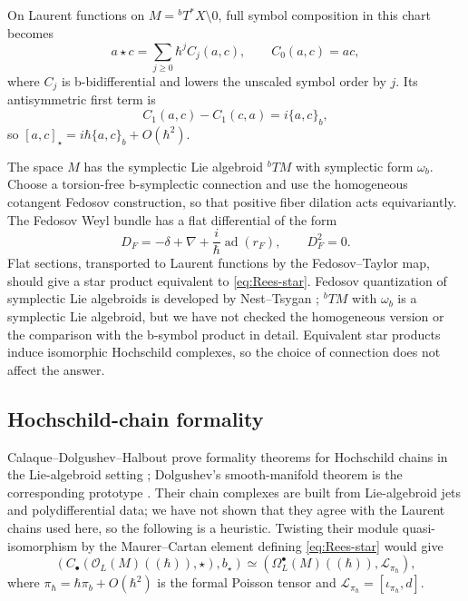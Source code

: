 \documentclass[11pt,oneside,reqno]{article}
\newcommand{\Tbstar}{{}^{b}T^*X}
\theoremstyle{plain}
\theoremstyle{definition}
\theoremstyle{remark}
\begin{document}
On Laurent functions on \(M=\Tbstar\setminus0\), full symbol composition in
this chart becomes
\begin{equation}\label{eq:Rees-star}
 a\star c=\sum_{j\geq0}\hbar^j C_j(a,c),
 \qquad C_0(a,c)=ac,
\end{equation}
where \(C_j\) is b-bidifferential and lowers the unscaled symbol order by
\(j\).  Its antisymmetric first term is
\[
 C_1(a,c)-C_1(c,a)=i\{a,c\}_b,
\]
so \([a,c]_\star=i\hbar\{a,c\}_b+O(\hbar^2)\).

The space \(M\) has the symplectic Lie algebroid \({}^bTM\) with symplectic
form \(\omega_b\).  Choose a torsion-free b-symplectic connection and use
the homogeneous cotangent Fedosov construction, so that positive fiber
dilation acts equivariantly.  The Fedosov Weyl bundle has a flat differential
of the form
\[
 D_F=-\delta+\nabla+\frac{i}{\hbar}\operatorname{ad}(r_F),
 \qquad D_F^2=0.
\]
Flat sections, transported to Laurent functions by the Fedosov--Taylor map,
should give a star product equivalent to \eqref{eq:Rees-star}.
Fedosov quantization of symplectic Lie algebroids is developed by
Nest--Tsygan \cite{NestTsygan}; \({}^bTM\) with \(\omega_b\) is a symplectic
Lie algebroid, but we have not checked the homogeneous version or the
comparison with the b-symbol product in detail.  Equivalent star products induce isomorphic Hochschild
complexes, so the choice of connection does not affect the answer.

\subsection{Hochschild-chain formality}

Calaque--Dolgushev--Halbout prove formality theorems for Hochschild chains
in the Lie-algebroid setting \cite{CDH}; Dolgushev's smooth-manifold
theorem is the corresponding prototype \cite{Dolgushev}.  Their chain
complexes are built from Lie-algebroid jets and polydifferential data; we
have not shown that they agree with the Laurent chains used here, so the
following is a heuristic.  Twisting their module quasi-isomorphism by the
Maurer--Cartan element defining \eqref{eq:Rees-star} would give
\begin{equation}\label{eq:chain-formality}
 \left(C_\bullet(\mathcal O_L(M)((\hbar)),\star),b_\star\right)
 \simeq
 \left(\Omega_L^\bullet(M)((\hbar)),
 \mathcal L_{\pi_\hbar}\right),
\end{equation}
where \(\pi_\hbar=\hbar\pi_b+O(\hbar^2)\) is the formal Poisson tensor and
\(\mathcal L_{\pi_\hbar}=[\iota_{\pi_\hbar},d]\).
\end{document}
